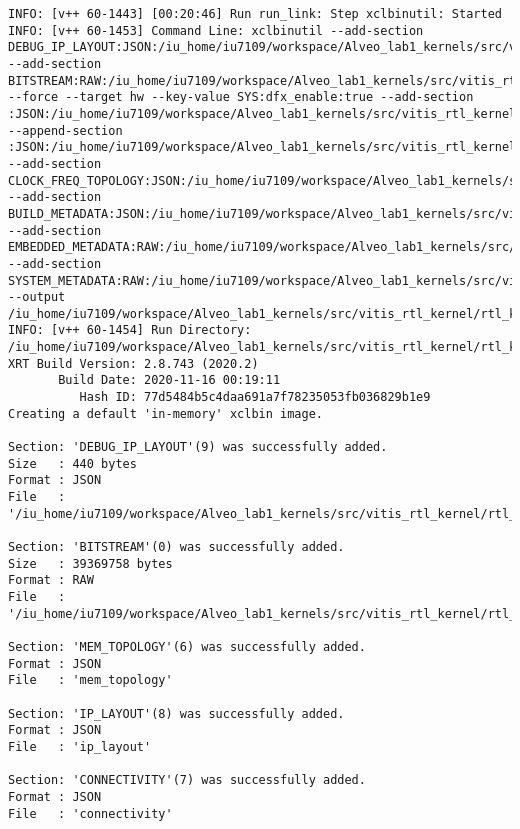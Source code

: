 \begin{center}
\begin{lstlisting}[label=lst:vlog,caption=Файл v++\_vinc.log]
INFO: [v++ 60-1443] [00:20:46] Run run_link: Step xclbinutil: Started
INFO: [v++ 60-1453] Command Line: xclbinutil --add-section DEBUG_IP_LAYOUT:JSON:/iu_home/iu7109/workspace/Alveo_lab1_kernels/src/vitis_rtl_kernel/rtl_kernel_wizard_2/_x/link/int/debug_ip_layout.rtd --add-section BITSTREAM:RAW:/iu_home/iu7109/workspace/Alveo_lab1_kernels/src/vitis_rtl_kernel/rtl_kernel_wizard_2/_x/link/int/partial.bit --force --target hw --key-value SYS:dfx_enable:true --add-section :JSON:/iu_home/iu7109/workspace/Alveo_lab1_kernels/src/vitis_rtl_kernel/rtl_kernel_wizard_2/_x/link/int/vinc.rtd --append-section :JSON:/iu_home/iu7109/workspace/Alveo_lab1_kernels/src/vitis_rtl_kernel/rtl_kernel_wizard_2/_x/link/int/appendSection.rtd --add-section CLOCK_FREQ_TOPOLOGY:JSON:/iu_home/iu7109/workspace/Alveo_lab1_kernels/src/vitis_rtl_kernel/rtl_kernel_wizard_2/_x/link/int/vinc_xml.rtd --add-section BUILD_METADATA:JSON:/iu_home/iu7109/workspace/Alveo_lab1_kernels/src/vitis_rtl_kernel/rtl_kernel_wizard_2/_x/link/int/vinc_build.rtd --add-section EMBEDDED_METADATA:RAW:/iu_home/iu7109/workspace/Alveo_lab1_kernels/src/vitis_rtl_kernel/rtl_kernel_wizard_2/_x/link/int/vinc.xml --add-section SYSTEM_METADATA:RAW:/iu_home/iu7109/workspace/Alveo_lab1_kernels/src/vitis_rtl_kernel/rtl_kernel_wizard_2/_x/link/int/systemDiagramModelSlrBaseAddress.json --output /iu_home/iu7109/workspace/Alveo_lab1_kernels/src/vitis_rtl_kernel/rtl_kernel_wizard_2/vinc.xclbin
INFO: [v++ 60-1454] Run Directory: /iu_home/iu7109/workspace/Alveo_lab1_kernels/src/vitis_rtl_kernel/rtl_kernel_wizard_2/_x/link/run_link
XRT Build Version: 2.8.743 (2020.2)
       Build Date: 2020-11-16 00:19:11
          Hash ID: 77d5484b5c4daa691a7f78235053fb036829b1e9
Creating a default 'in-memory' xclbin image.

Section: 'DEBUG_IP_LAYOUT'(9) was successfully added.
Size   : 440 bytes
Format : JSON
File   : '/iu_home/iu7109/workspace/Alveo_lab1_kernels/src/vitis_rtl_kernel/rtl_kernel_wizard_2/_x/link/int/debug_ip_layout.rtd'

Section: 'BITSTREAM'(0) was successfully added.
Size   : 39369758 bytes
Format : RAW
File   : '/iu_home/iu7109/workspace/Alveo_lab1_kernels/src/vitis_rtl_kernel/rtl_kernel_wizard_2/_x/link/int/partial.bit'

Section: 'MEM_TOPOLOGY'(6) was successfully added.
Format : JSON
File   : 'mem_topology'

Section: 'IP_LAYOUT'(8) was successfully added.
Format : JSON
File   : 'ip_layout'

Section: 'CONNECTIVITY'(7) was successfully added.
Format : JSON
File   : 'connectivity'


\end{lstlisting}
\end{center}
